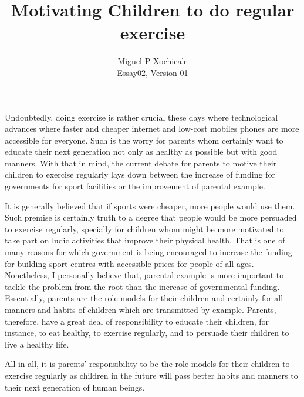 \documentclass[11pt]{article}
\title{Motivating Children to do regular exercise}
\author{Miguel P Xochicale \\
Essay02, Version 01}
\date{ }
\begin{document}
\maketitle
\thispagestyle{empty} %



Undoubtedly, doing exercise is rather crucial these days where technological advances
where faster and cheaper internet and low-cost mobiles phones are more accessible for 
everyone. Such is the worry for parents whom certainly want to educate their next generation 
not only as healthy as possible but with good  manners. With that in mind, 
the current debate for parents to motive their children to exercise regularly lays down 
between the increase of funding for governments for sport facilities or the improvement 
of parental example.

It is generally believed that if sports were cheaper, more people would use them.
Such premise is certainly truth to a degree that people would be more persuaded 
to exercise regularly, specially for children whom might be more motivated 
to take part on ludic activities that improve their physical health. 
That is one of many reasons for which government is being encouraged to increase 
the funding for building sport centres with accessible prices for people of all ages.
Nonetheless, I personally believe that, parental example is more important to tackle 
the problem from the root than the increase of governmental funding. 
Essentially, parents are the role models for their children and certainly for all 
manners and habits of children which are transmitted by example.
Parents, therefore, have a great deal of responsibility to educate their children,
for instance, to eat healthy, to exercise regularly, and to persuade their children 
to live a healthy life.

All in all, it is parents' responsibility to be the role models for their children
to exercise regularly as children in the future will pass better habits and manners 
to their next generation of human beings.
\end{document}
